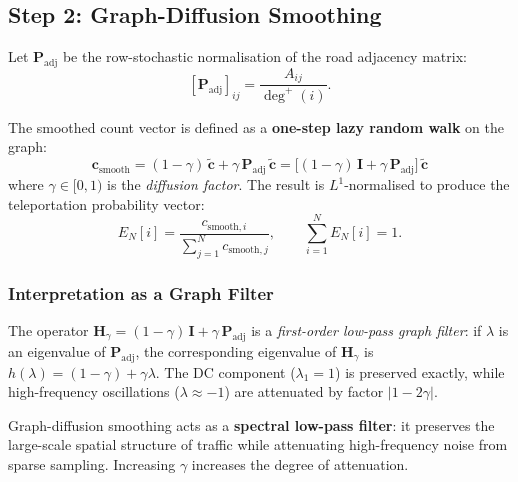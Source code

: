 \documentclass[12pt,a4paper]{article}
\theoremstyle{definition}
\theoremstyle{plain}
\begin{document}
\subsection{Step 2: Graph-Diffusion Smoothing}
\label{sec:diffusion}

Let $\mathbf{P}_{\text{adj}}$ be the row-stochastic normalisation of the road adjacency
matrix:
\[
  \left[\mathbf{P}_{\text{adj}}\right]_{ij}
  = \frac{A_{ij}}{\deg^{+}(i)}.
\]

The smoothed count vector is defined as a \textbf{one-step lazy random walk} on the graph:
\begin{equation}
  \boxed{
  \mathbf{c}_{\text{smooth}}
  = (1 - \gamma)\,\tilde{\mathbf{c}}
  + \gamma\,\mathbf{P}_{\text{adj}}\,\tilde{\mathbf{c}}
  = \bigl[(1-\gamma)\,\mathbf{I} + \gamma\,\mathbf{P}_{\text{adj}}\bigr]\,
    \tilde{\mathbf{c}}
  }
  \label{eq:smoothing}
\end{equation}
where $\gamma \in [0,1)$ is the \emph{diffusion factor}. The result is $L^1$-normalised
to produce the teleportation probability vector:
\begin{equation}
  E_N[i] = \frac{c_{\text{smooth},i}}{\displaystyle\sum_{j=1}^N c_{\text{smooth},j}},
  \qquad \sum_{i=1}^N E_N[i] = 1.
\end{equation}

\subsubsection{Interpretation as a Graph Filter}

The operator $\mathbf{H}_\gamma = (1-\gamma)\,\mathbf{I} + \gamma\,\mathbf{P}_{\text{adj}}$
is a \emph{first-order low-pass graph filter}: if $\lambda$ is an eigenvalue of
$\mathbf{P}_{\text{adj}}$, the corresponding eigenvalue of $\mathbf{H}_\gamma$ is
$h(\lambda) = (1-\gamma) + \gamma\lambda$. The DC component ($\lambda_1=1$) is
preserved exactly, while high-frequency oscillations ($\lambda \approx -1$) are
attenuated by factor $|1-2\gamma|$.

\begin{insight}
  Graph-diffusion smoothing acts as a \textbf{spectral low-pass filter}: it preserves the
  large-scale spatial structure of traffic while attenuating high-frequency noise from
  sparse sampling. Increasing $\gamma$ increases the degree of attenuation.
\end{insight}
\end{document}
